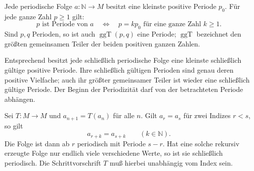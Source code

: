 \begin{theorem}
\label{b21guide:thm:least-period}
Jede periodische Folge $a\colon\mathbb N\to M$ besitzt eine
kleinste positive Periode $p_0$. Für jede ganze Zahl $p\geq1$ gilt:
\[
 p\text{ ist Periode von }a
 \quad\Longleftrightarrow\quad
 p=kp_0\text{ für eine ganze Zahl }k\geq1.
\]
Sind $p,q$ Perioden, so ist auch $\operatorname{ggT}(p,q)$
eine Periode; $\operatorname{ggT}$ bezeichnet den größten
gemeinsamen Teiler der beiden positiven ganzen Zahlen.

Entsprechend besitzt jede schließlich periodische Folge eine
kleinste schließlich gültige positive Periode. Ihre schließlich
gültigen Perioden sind genau deren positive Vielfache;
auch ihr größter gemeinsamer Teiler ist wieder eine schließlich
gültige Periode. Der Beginn der Periodizität darf von der
betrachteten Periode abhängen.
\end{theorem}

\begin{theorem}
\label{b21guide:thm:recursive-period}
Sei $T\colon M\to M$ und $a_{n+1}=T(a_n)$ für alle $n$.
Gilt $a_r=a_s$ für zwei Indizes $r<s$, so gilt
\[
 a_{r+k}=a_{s+k}\qquad(k\in\mathbb N).
\]
Die Folge ist dann ab $r$ periodisch mit Periode $s-r$.
Hat eine solche rekursiv erzeugte Folge nur endlich viele
verschiedene Werte, so ist sie schließlich periodisch.
Die Schrittvorschrift $T$ muß hierbei unabhängig vom Index sein.
\end{theorem}
